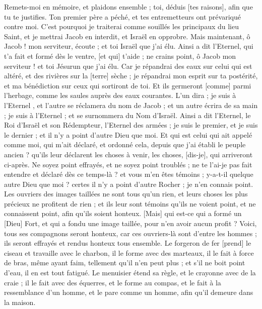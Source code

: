 \begin{multicols}{2}
Remets-moi en mémoire, et plaidons ensemble ; toi, déduis [tes raisons], afin que tu te justifies.
Ton premier père a péché, et tes entremetteurs ont prévariqué contre moi.
C'est pourquoi je traiterai comme souillés les principaux du lieu Saint, et je mettrai Jacob en interdit, et Israël en opprobre.
\VerseOne{}Mais maintenant, ô Jacob ! mon serviteur, écoute ; et toi Israël que j'ai élu.
Ainsi a dit l'Eternel, qui t'a fait et formé dès le ventre, [et qui] t'aide ; ne crains point, ô Jacob mon serviteur ! et toi Jésurun que j'ai élu.
Car je répandrai des eaux sur celui qui est altéré, et des rivières sur la [terre] sèche ; je répandrai mon esprit sur ta postérité, et ma bénédiction sur ceux qui sortiront de toi.
Et ils germeront [comme] parmi l'herbage, comme les saules auprès des eaux courantes.
L'un dira ; je suis à l'Eternel , et l'autre se réclamera du nom de Jacob ; et un autre écrira de sa main ; je suis à l'Eternel ; et se surnommera du Nom d'Israël.
Ainsi a dit l'Eternel, le Roi d'Israël et son Rédempteur, l'Eternel des armées ; je suis le premier, et je suis le dernier ; et il n'y a point d'autre Dieu que moi.
Et qui est celui qui ait appelé comme moi, qui m'ait déclaré, et ordonné cela, depuis que j'ai établi le peuple ancien ? qu'ils leur déclarent les choses à venir, les choses, [dis-je], qui arriveront ci-après.
Ne soyez point effrayés, et ne soyez point troublés ; ne te l'ai-je pas fait entendre et déclaré dès ce temps-là ? et vous m'en êtes témoins ; y-a-t-il quelque autre Dieu que moi ? certes il n'y a point d'autre Rocher ; je n'en connais point.
Les ouvriers des images taillées ne sont tous qu'un rien, et leurs choses les plus précieux ne profitent de rien ; et ils leur sont témoins qu'ils ne voient point, et ne connaissent point, afin qu'ils soient honteux.
[Mais] qui est-ce qui a formé un [Dieu] Fort, et qui a fondu une image taillée, pour n'en avoir aucun profit ?
Voici, tous ses compagnons seront honteux, car ces ouvriers-là sont d'entre les hommes ; ils seront effrayés et rendus honteux tous ensemble.
Le forgeron de fer [prend] le ciseau et travaille avec le charbon, il le forme avec des marteaux, il le fait à force de bras, même ayant faim, tellement qu'il n'en peut plus ; et s'il ne boit point d'eau, il en est tout fatigué.
Le menuisier étend sa règle, et le crayonne avec de la craie ; il le fait avec des équerres, et le forme au compas, et le fait à la ressemblance d'un homme, et le pare comme un homme, afin qu'il demeure dans la maison.

\end{multicols}
